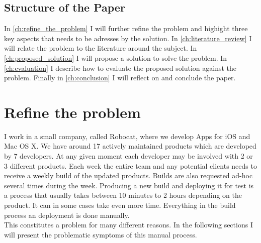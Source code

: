\documentclass{ituthesis}
\begin{document}

\section{Structure of the Paper}

In \autoref{ch:refine_the_problem} I will further refine the problem and highight three key aspects that needs to be adresses by the solution. In \autoref{ch:literature_review} I will relate the problem to the literature around the subject. In \autoref{ch:proposed_solution} I will propose a solution to solve the problem. In \autoref{ch:evaluation} I describe how to evaluate the proposed solution against the problem. Finally in \autoref{ch:conclusion} I will reflect on and conclude the paper.

\chapter{Refine the problem}
\label{ch:refine_the_problem}

I work in a small company, called Robocat, where we develop Apps for iOS and Mac OS X. We have around 17 actively maintained products which are developed by 7 developers. At any given moment each developer may be involved with 2 or 3 different products. Each week the entire team and any potential clients needs to receive a weekly build of the updated products. Builds are also requested ad-hoc several times during the week. Producing a new build and deploying it for test is a process that usually takes between 10 minutes to 2 hours depending on the product. It can in some cases take even more time. Everything in the build process an deployment is done manually.\\

This constitutes a problem for many different reasons. In the following sections I will present the problematic symptoms of this manual process.
\end{document}
